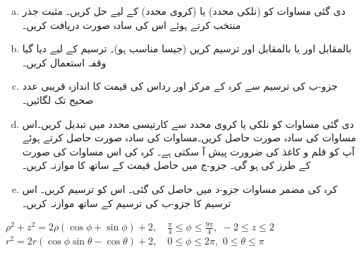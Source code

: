\begin{enumerate}[a.]
\item
دی گئی مساوات کو  (نلکی محدد)   یا   (کروی محدد) کے لیے حل کریں۔ مثبت  جذر  منتخب کرتے ہوئے  اس کی سادہ صورت دریافت کریں۔
\item
{} بالمقابل  اور  یا  بالمقابل  اور  ترسیم کریں (جیسا مناسب ہو)۔ ترسیم کے لیے دیا گیا وقفہ استعمال کریں۔
\item
جزو-ب  کی ترسیم سے کرہ کے  مرکز اور رداس کی قیمت کا اندازہ قریبی عدد صحیح  تک   لگائیں۔
\item
دی گئی مساوات کو نلکی یا کروی محدد سے کارتیسی محدد میں تبدیل کریں۔اس مساوات کی سادہ صورت حاصل کریں۔مساوات کی سادہ صورت حاصل کرتے ہوئے آپ کو قلم و کاغذ کی ضرورت پیش آ سکتی ہے۔ کرہ کی اس مساوات کی صورت
 کے طرز کی   ہو گی۔   جزو-ج میں حاصل قیمت کے ساتھ  کا موازنہ کریں۔
\item
کرہ کی مضمر مساوات جزو-د میں حاصل کی گئی۔ اس کو ترسیم کریں۔ اس ترسیم کا جزو-ب کی ترسیم کے ساتھ موازنہ کریں۔
\end{enumerate}
$\rho^2+z^2=2\rho(\cos\phi+\sin\phi)+2,\quad \frac{\pi}{4}\le\phi\le\frac{9\pi}{4},\,\, -2\le z\le 2$
$r^2=2r(\cos\phi\sin\theta-\cos\theta)+2,\quad 0\le \phi\le 2\pi,\,\,0\le\theta\le \pi$




